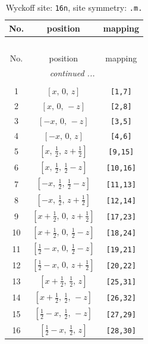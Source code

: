 \documentclass[fleqn,8pt]{jsarticle}
\begin{document}
\renewcommand{\arraystretch}{1.2}
\begin{longtable}{ccc}
\caption{Wyckoff site: {\tt 16n}, site symmetry: {\tt .m.}}
 \\
 \hline \hline
No. & position & mapping \\ \hline \endfirsthead

\multicolumn{2}{l}{\tablename\ \thetable{}} \\
 \hline \hline
No. & position & mapping \\ \hline \endhead

 \hline \hline
\multicolumn{2}{r}{\footnotesize\it continued ...} \\ \endfoot

 \hline \hline
\multicolumn{2}{r}{} \\ \endlastfoot

1 & $\left[ x,\, 0,\, z \right]$ & {\tt [1,7]} \\ \hline
2 & $\left[ x,\, 0,\, - z \right]$ & {\tt [2,8]} \\ \hline
3 & $\left[ - x,\, 0,\, - z \right]$ & {\tt [3,5]} \\ \hline
4 & $\left[ - x,\, 0,\, z \right]$ & {\tt [4,6]} \\ \hline
5 & $\left[ x,\, \frac{1}{2},\, z + \frac{1}{2} \right]$ & {\tt [9,15]} \\ \hline
6 & $\left[ x,\, \frac{1}{2},\, \frac{1}{2} - z \right]$ & {\tt [10,16]} \\ \hline
7 & $\left[ - x,\, \frac{1}{2},\, \frac{1}{2} - z \right]$ & {\tt [11,13]} \\ \hline
8 & $\left[ - x,\, \frac{1}{2},\, z + \frac{1}{2} \right]$ & {\tt [12,14]} \\ \hline
9 & $\left[ x + \frac{1}{2},\, 0,\, z + \frac{1}{2} \right]$ & {\tt [17,23]} \\ \hline
10 & $\left[ x + \frac{1}{2},\, 0,\, \frac{1}{2} - z \right]$ & {\tt [18,24]} \\ \hline
11 & $\left[ \frac{1}{2} - x,\, 0,\, \frac{1}{2} - z \right]$ & {\tt [19,21]} \\ \hline
12 & $\left[ \frac{1}{2} - x,\, 0,\, z + \frac{1}{2} \right]$ & {\tt [20,22]} \\ \hline
13 & $\left[ x + \frac{1}{2},\, \frac{1}{2},\, z \right]$ & {\tt [25,31]} \\ \hline
14 & $\left[ x + \frac{1}{2},\, \frac{1}{2},\, - z \right]$ & {\tt [26,32]} \\ \hline
15 & $\left[ \frac{1}{2} - x,\, \frac{1}{2},\, - z \right]$ & {\tt [27,29]} \\ \hline
16 & $\left[ \frac{1}{2} - x,\, \frac{1}{2},\, z \right]$ & {\tt [28,30]} \\
\end{longtable}
\end{document}

